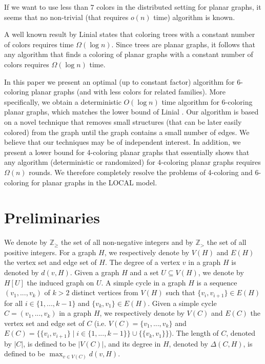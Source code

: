 \documentclass{article}
\theoremstyle{definition}
\def \Z {{\mathbb Z}}
\begin{document}
If we want to use less than $7$ colors in the distributed setting for planar graphs, it seems that no non-trivial (that requires $o(n)$ time) algorithm is known.


A well known result by Linial \cite{Linial90} states that coloring trees with a constant number of colors requires time $\Omega(\log n)$. Since trees are planar graphs, it follows that any algorithm that finds a coloring of planar graphs with a constant number of colors requires $\Omega(\log n)$ time.

In this paper we present an optimal (up to constant factor) algorithm for 6-coloring planar graphs (and with less colors for related families). More specifically, we obtain a deterministic $O(\log{n})$ time algorithm for 6-coloring planar graphs, which matches the lower bound of Linial \cite{Linial90}.
Our algorithm is based on a novel technique that removes small structures (that can be later easily colored) from the graph until the graph contains a small number of edges.
We believe that our techniques may be of independent interest.
In addition, we present a lower bound for 4-coloring planar graphs that essentially shows that any algorithm (deterministic or randomized) for $4$-coloring planar graphs requires $\Omega(n)$ rounds.
We therefore completely resolve the problems of 4-coloring and 6-coloring for planar graphs in the LOCAL model.

\section{Preliminaries} \label{sec:preliminaries}
     We denote by $\Z_{\ge}$ the set of all non-negative integers and by $\Z_{>}$ the set of all positive integers. For a graph $H$, we respectively denote by $V(H)$ and $E(H)$ the vertex set and edge set of $H$. The degree of a vertex $v$ in a graph $H$ is denoted by $d(v,H)$. Given a graph $H$ and a set $U \subseteq V(H)$, we denote by $H[U]$ the induced graph on $U$. A simple cycle in a graph $H$ is a sequence $(v_{1},...,v_{k})$ of $k > 2$ distinct vertices from $V(H)$ such that $\{v_{i},v_{i+1}\} \in E(H)$ for all $i \in \{1,...,k-1\}$ and $\{v_{k},v_{1}\} \in E(H)$. Given a simple cycle $C = (v_{1},...,v_{k})$ in a graph $H$, we respectively denote by $V(C)$ and $E(C)$ the vertex set and edge set of $C$ (i.e. $V(C) = \{v_{1},...,v_{k}\}$ and $E(C) = \{\{v_{i},v_{i+1}\} \mid i \in \{1,...,k-1\}\} \cup \{\{v_{k},v_{1}\}\}$). The length of $C$, denoted by $|C|$, is defined to be $|V(C)|$, and its degree in $H$, denoted by $\Delta(C,H)$, is defined to be $\max_{v \in V(C)}{d(v,H)}$.
\end{document}
